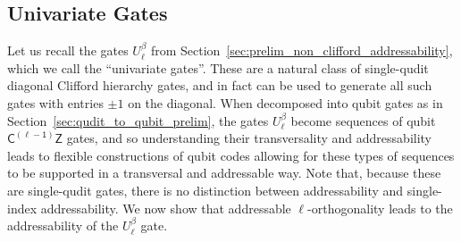 \documentclass[11pt]{article}
\theoremstyle{definition}
\newcommand{\CLZ}{\mathsf{C^{(\ell-1)}Z}}
\begin{document}
\subsection{Univariate Gates}\label{sec:address_ortho_univariate_gates}
Let us recall the gates $U_\ell^\beta$ from Section~\ref{sec:prelim_non_clifford_addressability}, which we call the ``univariate gates''. These are a natural class of single-qudit diagonal Clifford hierarchy gates, and in fact can be used to generate all such gates with entries $\pm 1$ on the diagonal. When decomposed into qubit gates as in Section~\ref{sec:qudit_to_qubit_prelim}, the gates $U_\ell^\beta$ become sequences of qubit $\CLZ$ gates, and so understanding their transversality and addressability leads to flexible constructions of qubit codes allowing for these types of sequences to be supported in a transversal and addressable way. Note that, because these are single-qudit gates, there is no distinction between addressability and single-index addressability. We now show that addressable $\ell$-orthogonality leads to the addressability of the $U_\ell^\beta$ gate.
\end{document}
